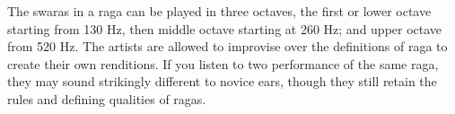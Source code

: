The swaras in a raga can be played in three octaves, the first or lower octave starting from 130 Hz, then middle octave starting at 260 Hz; and upper octave from 520 Hz. The artists are allowed to improvise over the definitions of raga to create their own renditions. If you listen to two performance of the same raga, they may sound strikingly different to novice ears, though they still retain the rules and defining qualities of ragas. \par
